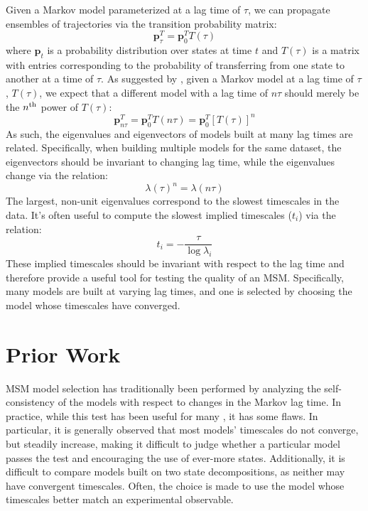 \documentclass[journal=jpcbfk, layout=traditional, manuscript=article]{achemso}
\begin{document}
Given a Markov model parameterized at a lag time of $\tau$, we can propagate ensembles of trajectories via the transition probability matrix:
$$\mathbf{p}_\tau^T = \mathbf{p}_0^T T(\tau)$$ where $\mathbf{p}_t$ is a probability distribution over states at time $t$ and $T(\tau)$ is a matrix with entries corresponding to the probability of transferring from one state to another at a time of $\tau$. As suggested by \citet{Swope2004Describing}, given a Markov model at a lag time of $\tau$, $T(\tau)$, we expect that a different model with a lag time of $n\tau$ should merely be the $n^\textnormal{th}$ power of $T(\tau)$:
$$\mathbf{p}_{n\tau}^T = \mathbf{p}_0^T T(n\tau) = \mathbf{p}_0^T \left[T(\tau)\right]^n $$ As such, the eigenvalues and eigenvectors of models built at many lag times are related. Specifically, when building multiple models for the same dataset, the eigenvectors should be invariant to changing lag time, while the eigenvalues change via the relation:
$$\lambda(\tau)^n = \lambda(n \tau)$$ The largest, non-unit eigenvalues correspond to the slowest timescales in the data. It's often useful to compute the slowest implied timescales ($t_i$) via the relation:
$$t_i = - \frac{\tau}{\log \lambda_i} $$ These implied timescales should be invariant with respect to the lag time and therefore provide a useful tool for testing the quality of an MSM. Specifically, many models are built at varying lag times, and one is selected by choosing the model whose timescales have converged.

\section{Prior Work}
MSM model selection has traditionally been performed by analyzing the self-consistency of the models with respect to changes in the Markov lag time. In practice, while this test has been useful for many \cite{Noe2009Constructing}, it has some flaws. In particular, it is generally observed that most models' timescales do not converge, but steadily increase, making it difficult to judge whether a particular model passes the test and encouraging the use of ever-more states. Additionally, it is difficult to compare models built on two state decompositions, as neither may have convergent timescales. Often, the choice is made to use the model whose timescales better match an experimental observable.
\end{document}
